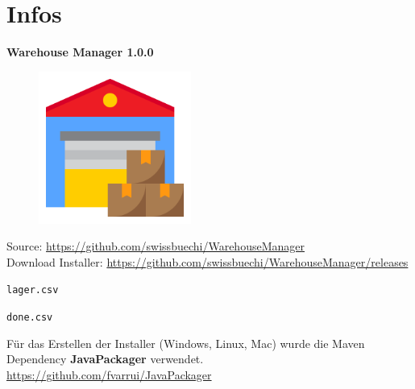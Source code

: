 \chapter{Infos}

\textbf{Warehouse Manager 1.0.0}

\begin{figure}[h!]
    \includegraphics[width=5cm]{../src/main/resources/images/logo.png}
\end{figure}

Source: \url{https://github.com/swissbuechi/WarehouseManager} \\
Download Installer: \url{https://github.com/swissbuechi/WarehouseManager/releases}

\verb|lager.csv|



\verb|done.csv|



Für das Erstellen der Installer (Windows, Linux, Mac) wurde die Maven Dependency \textbf{JavaPackager} verwendet. \\
\url{https://github.com/fvarrui/JavaPackager}